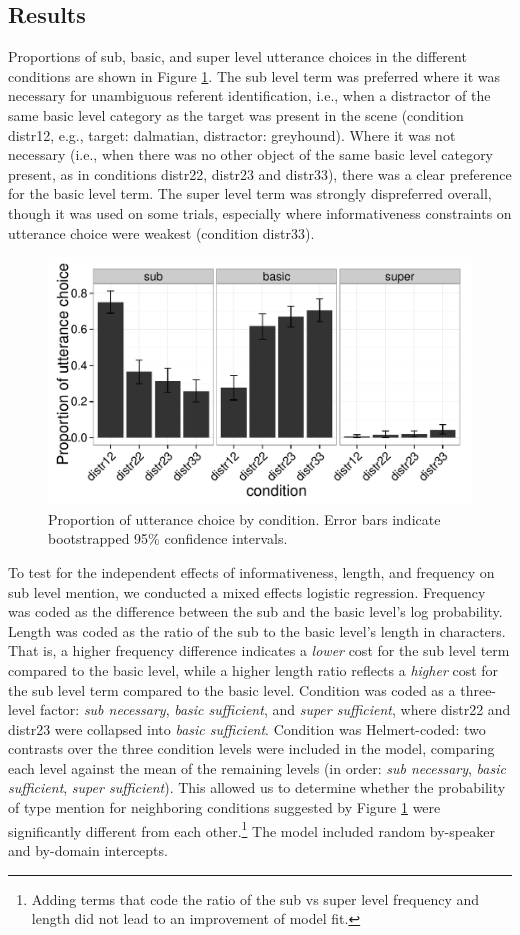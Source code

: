 \documentclass[10pt,letterpaper]{article}
\newcommand{\figref}[1]{Figure \ref{#1}}
\begin{document}
\subsection{\bf Results}

Proportions of sub, basic, and super level utterance choices in the different conditions are shown in \figref{fig:results1}. The sub level term was preferred where it was necessary for unambiguous referent identification, i.e., when a distractor of the same basic level category as the target was present in the scene (condition distr12, e.g., target: dalmatian, distractor: greyhound). Where it was not necessary (i.e., when there was no other object of the same basic level category present, as in conditions distr22, distr23 and distr33), there was a clear preference for the basic level term. The super level term was strongly dispreferred overall, though it was used on some trials, especially where informativeness constraints on utterance choice were weakest (condition distr33). 

\begin{figure}[ht!]
\centering
\includegraphics[width=.5\textwidth]{graphs/results-collapsed}
\caption{Proportion of utterance choice by condition. Error bars indicate bootstrapped 95\% confidence intervals.}
\label{fig:results1}
\end{figure}

To test for the independent effects of informativeness, length, and frequency on sub level mention, we conducted a mixed effects logistic regression. Frequency was coded as the difference between the sub and the basic level's log probability. Length was coded as the ratio of the sub to the basic level's length in characters. That is, a higher frequency difference indicates a \emph{lower} cost for the sub level term compared to the basic level, while a higher length ratio reflects a \emph{higher} cost for the sub level term compared to the basic level. Condition was coded as a three-level factor: \emph{sub necessary}, \emph{basic sufficient}, and \emph{super sufficient}, where distr22 and distr23 were collapsed into \emph{basic sufficient}. Condition was Helmert-coded: two contrasts over the three condition levels were included in the model, comparing each level against the mean of the remaining levels (in order: \emph{sub necessary}, \emph{basic sufficient}, \emph{super sufficient}). This allowed us to determine whether the probability of type mention  for neighboring conditions suggested by \figref{fig:results1} were significantly different from each other.\footnote{Adding terms that code the ratio of the sub vs super level frequency and length did not lead to an improvement of model fit.} The model included random by-speaker and by-domain intercepts. 
\end{document}
